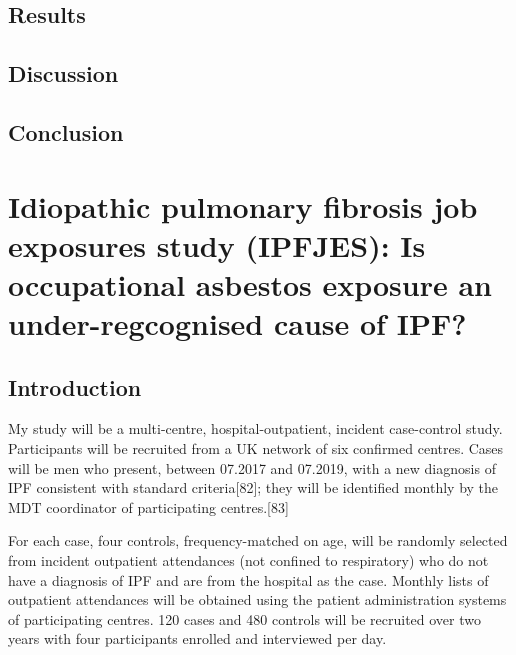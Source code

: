 \documentclass[12pt,a4paper,]{report}
\begin{document}
\hypertarget{results-3}{%
\section{Results}\label{results-3}}

\hypertarget{discussion-3}{%
\section{Discussion}\label{discussion-3}}

\hypertarget{conclusion-3}{%
\section{Conclusion}\label{conclusion-3}}

\hypertarget{idiopathic-pulmonary-fibrosis-job-exposures-study-ipfjes-is-occupational-asbestos-exposure-an-under-regcognised-cause-of-ipf}{%
\chapter{Idiopathic pulmonary fibrosis job exposures study (IPFJES): Is
occupational asbestos exposure an under-regcognised cause of
IPF?}\label{idiopathic-pulmonary-fibrosis-job-exposures-study-ipfjes-is-occupational-asbestos-exposure-an-under-regcognised-cause-of-ipf}}

\hypertarget{introduction-4}{%
\section{Introduction}\label{introduction-4}}

My study will be a multi-centre, hospital-outpatient, incident
case-control study. Participants will be recruited from a UK network of
six confirmed centres. Cases will be men who present, between 07.2017
and 07.2019, with a new diagnosis of IPF consistent with standard
criteria{[}82{]}; they will be identified monthly by the MDT coordinator
of participating centres.{[}83{]}

For each case, four controls, frequency-matched on age, will be randomly
selected from incident outpatient attendances (not confined to
respiratory) who do not have a diagnosis of IPF and are from the
hospital as the case. Monthly lists of outpatient attendances will be
obtained using the patient administration systems of participating
centres. 120 cases and 480 controls will be recruited over two years
with four participants enrolled and interviewed per day.
\end{document}
